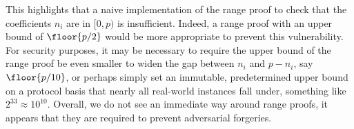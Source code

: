 \documentclass{article}
\theoremstyle{definition}
\newcommand{\6}{\mathbf}
\newcommand{\7}{\mathcal}
\begin{document}
\medskip 

This highlights that a naive implementation of the range proof to check that the coefficients $n_i$ are in $[0, p)$ is insufficient. 
Indeed, a range proof with an upper bound of $\floor{p/2}$ would be more appropriate to prevent this vulnerability. 
For security purposes, it may be necessary to require the upper bound of the range proof be even smaller to widen the gap between $n_i$ and $p - n_i$, say $\floor{p/10}$, or perhaps simply set an immutable, predetermined upper bound on a protocol basis that nearly all real-world instances fall under, something like $2^{33} \approx 10^{10}$.
Overall, we do not see an immediate way around range proofs, it appears that they are required to prevent adversarial forgeries. 









































\end{document}
